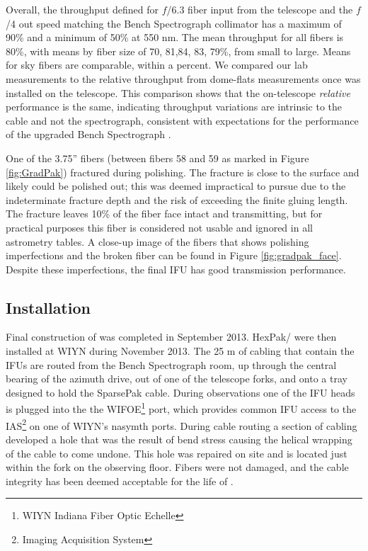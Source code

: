 Overall, the throughput defined for $f$/6.3 fiber input from the
telescope and the $f$/4 out speed matching the Bench Spectrograph
collimator has a maximum of 90\% and a minimum of 50\% at 550 nm. The
mean throughput for all fibers is 80\%, with means by fiber size of
70, 81,84, 83, 79\%, from small to large. Means for sky fibers are
comparable, within a percent. We compared our lab measurements to the
relative throughput from dome-flats measurements once \GP was
installed on the telescope. This comparison shows that the
on-telescope {\it relative} performance is the same, indicating
throughput variations are intrinsic to the cable and not the
spectrograph, consistent with expectations for the performance of the
upgraded Bench Spectrograph \citep{Bershady08,Knezek10}.

One of the 3.75'' fibers (between fibers 58 and 59 as marked in Figure
\ref{fig:GradPak}) fractured during polishing. The fracture is close
to the surface and likely could be polished out; this was deemed
impractical to pursue due to the indeterminate fracture depth and the
risk of exceeding the finite gluing length. The fracture leaves 10\%
of the fiber face intact and transmitting, but for practical purposes
this fiber is considered not usable and ignored in all astrometry
tables.  A close-up image of the \GP fibers that shows polishing
imperfections and the broken fiber can be found in Figure
\ref{fig:gradpak_face}.  Despite these imperfections, the final IFU
has good transmission performance.

\subsection{Installation}
\label{sec:install}

Final construction of \GP was completed in September 2013.  HexPak/\GP
were then installed at WIYN during November 2013. The 25 m of cabling
that contain the IFUs are routed from the Bench Spectrograph room, up
through the central bearing of the azimuth drive, out of one of the
telescope forks, and onto a tray designed to hold the SparsePak
cable. During observations one of the IFU heads is plugged into the
the WIFOE\footnote{WIYN Indiana Fiber Optic Echelle} port, which
provides common IFU access to the IAS\footnote{Imaging Acquisition
  System} on one of WIYN's nasymth ports. During cable routing a
section of cabling developed a hole that was the result of bend stress
causing the helical wrapping of the cable to come undone. This hole
was repaired on site and is located just within the fork on the
observing floor. Fibers were not damaged, and the cable integrity has
been deemed acceptable for the life of \GP.

